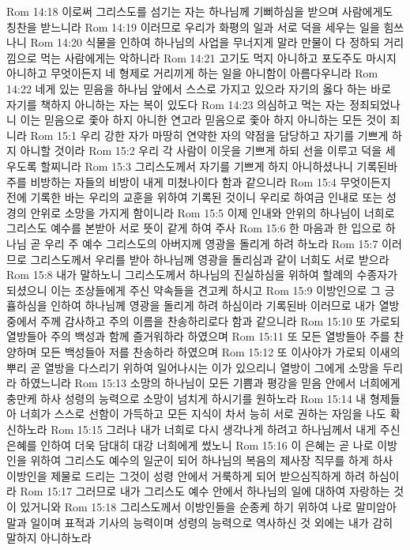 Rom 14:18  이로써 그리스도를 섬기는 자는 하나님께 기뻐하심을 받으며 사람에게도 칭찬을 받느니라
Rom 14:19  이러므로 우리가 화평의 일과 서로 덕을 세우는 일을 힘쓰나니
Rom 14:20  식물을 인하여 하나님의 사업을 무너지게 말라 만물이 다 정하되 거리낌으로 먹는 사람에게는 악하니라
Rom 14:21  고기도 먹지 아니하고 포도주도 마시지 아니하고 무엇이든지 네 형제로 거리끼게 하는 일을 아니함이 아름다우니라
Rom 14:22  네게 있는 믿음을 하나님 앞에서 스스로 가지고 있으라 자기의 옳다 하는 바로 자기를 책하지 아니하는 자는 복이 있도다
Rom 14:23  의심하고 먹는 자는 정죄되었나니 이는 믿음으로 좇아 하지 아니한 연고라 믿음으로 좇아 하지 아니하는 모든 것이 죄니라
Rom 15:1  우리 강한 자가 마땅히 연약한 자의 약점을 담당하고 자기를 기쁘게 하지 아니할 것이라
Rom 15:2  우리 각 사람이 이웃을 기쁘게 하되 선을 이루고 덕을 세우도록 할찌니라
Rom 15:3  그리스도께서 자기를 기쁘게 하지 아니하셨나니 기록된바 주를 비방하는 자들의 비방이 내게 미쳤나이다 함과 같으니라
Rom 15:4  무엇이든지 전에 기록한 바는 우리의 교훈을 위하여 기록된 것이니 우리로 하여금 인내로 또는 성경의 안위로 소망을 가지게 함이니라
Rom 15:5  이제 인내와 안위의 하나님이 너희로 그리스도 예수를 본받아 서로 뜻이 같게 하여 주사
Rom 15:6  한 마음과 한 입으로 하나님 곧 우리 주 예수 그리스도의 아버지께 영광을 돌리게 하려 하노라
Rom 15:7  이러므로 그리스도께서 우리를 받아 하나님께 영광을 돌리심과 같이 너희도 서로 받으라
Rom 15:8  내가 말하노니 그리스도께서 하나님의 진실하심을 위하여 할례의 수종자가 되셨으니 이는 조상들에게 주신 약속들을 견고케 하시고
Rom 15:9  이방인으로 그 긍휼하심을 인하여 하나님께 영광을 돌리게 하려 하심이라 기록된바 이러므로 내가 열방 중에서 주께 감사하고 주의 이름을 찬송하리로다 함과 같으니라
Rom 15:10  또 가로되 열방들아 주의 백성과 함께 즐거워하라 하였으며
Rom 15:11  또 모든 열방들아 주를 찬양하며 모든 백성들아 저를 찬송하라 하였으며
Rom 15:12  또 이사야가 가로되 이새의 뿌리 곧 열방을 다스리기 위하여 일어나시는 이가 있으리니 열방이 그에게 소망을 두리라 하였느니라
Rom 15:13  소망의 하나님이 모든 기쁨과 평강을 믿음 안에서 너희에게 충만케 하사 성령의 능력으로 소망이 넘치게 하시기를 원하노라
Rom 15:14  내 형제들아 너희가 스스로 선함이 가득하고 모든 지식이 차서 능히 서로 권하는 자임을 나도 확신하노라
Rom 15:15  그러나 내가 너희로 다시 생각나게 하려고 하나님께서 내게 주신 은혜를 인하여 더욱 담대히 대강 너희에게 썼노니
Rom 15:16  이 은혜는 곧 나로 이방인을 위하여 그리스도 예수의 일군이 되어 하나님의 복음의 제사장 직무를 하게 하사 이방인을 제물로 드리는 그것이 성령 안에서 거룩하게 되어 받으심직하게 하려 하심이라
Rom 15:17  그러므로 내가 그리스도 예수 안에서 하나님의 일에 대하여 자랑하는 것이 있거니와
Rom 15:18  그리스도께서 이방인들을 순종케 하기 위하여 나로 말미암아 말과 일이며 표적과 기사의 능력이며 성령의 능력으로 역사하신 것 외에는 내가 감히 말하지 아니하노라
